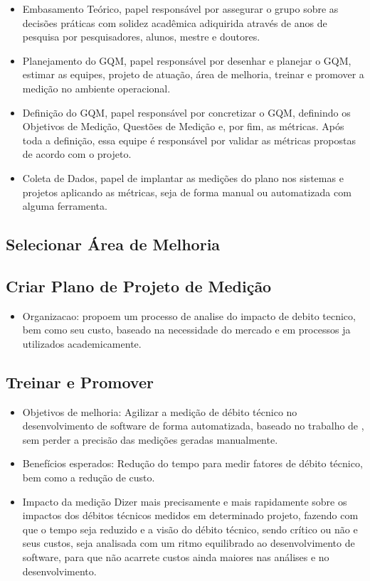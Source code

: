 \begin{itemize}
  \item Embasamento Teórico, papel responsável por assegurar o grupo sobre as decisões
  práticas com solidez acadêmica adiquirida através de anos de pesquisa por pesquisadores,
  alunos, mestre e doutores.

  \item Planejamento do GQM, papel responsável por desenhar e planejar o GQM, estimar
  as equipes, projeto de atuação, área de melhoria, treinar e promover a medição
  no ambiente operacional.

  \item Definição do GQM, papel responsável por concretizar o GQM, definindo os
  Objetivos de Medição, Questões de Medição e, por fim, as métricas. Após toda a
  definição, essa equipe é responsável por validar as métricas propostas de acordo
  com o projeto.

  \item Coleta de Dados, papel de implantar as medições do plano nos sistemas e
  projetos aplicando as métricas, seja de forma manual ou automatizada com alguma
  ferramenta.
\end{itemize}

\subsection{Selecionar Área de Melhoria}
\subsection{Criar Plano de Projeto de Medição}

\begin{itemize}
\item Organizacao: \cite{td} propoem um processo de analise do impacto de debito tecnico,
bem como seu custo, baseado na necessidade do mercado e em processos ja utilizados academicamente.
\end{itemize}

\subsection{Treinar e Promover}
\begin{itemize}
\item Objetivos de melhoria: Agilizar a medição de débito técnico no desenvolvimento de software de forma
automatizada, baseado no trabalho de \cite{td}, sem perder a precisão das medições geradas manualmente.

\item Benefícios esperados: \cite{td} Redução do tempo para medir fatores de débito técnico, bem como a
redução de custo.

\item Impacto da medição \cite{td} Dizer mais precisamente e mais rapidamente sobre os impactos dos débitos
técnicos medidos em determinado projeto, fazendo com que o tempo seja reduzido e a visão do débito técnico, sendo
crítico ou não e seus custos, seja analisada com um ritmo equilibrado ao desenvolvimento de software, para que não acarrete
custos ainda maiores nas análises e no desenvolvimento.

\end{itemize}

